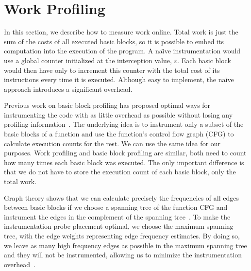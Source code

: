 \section{Work Profiling}

In this section, we describe how to measure work online. Total work is just the sum of the costs of all executed basic blocks, so it is
possible to embed its computation into the execution of the program. A na\"{\i}ve instrumentation would use a global counter initialized at
the interception value, $\varepsilon$. Each basic block would then have only to increment this counter with the total cost of its
instructions every time it is executed. Although easy to implement, the na\"{\i}ve approach introduces a significant overhead.

Previous work on basic block profiling has proposed optimal ways for instrumenting the code with as little overhead as possible without
losing any profiling information~\citep{knuth73,ball94}. The underlying idea is to instrument only a subset of the basic blocks of a
function and use the function's control flow graph (CFG) to calculate execution counts for the rest. We can use the same idea for our
purposes. Work profiling and basic block profiling are similar, both need to count how many times each basic block was executed. The only
important difference is that we do not have to store the execution count of each basic block, only the total work.

Graph theory shows that we can calculate precisely the frequencies of all edges between basic blocks if we choose a spanning tree of the
function CFG and instrument the edges in the complement of the spanning tree~\cite{nahapetian73,forman81}.
To make the instrumentation probe placement optimal, we choose the maximum spanning tree,
with the edge weights representing edge frequency estimates. By doing so, we leave as many high frequency edges as possible in the
maximum spanning tree and they will not be instrumented, allowing us to minimize the instrumentation overhead~\cite{forman81,ball94}.

